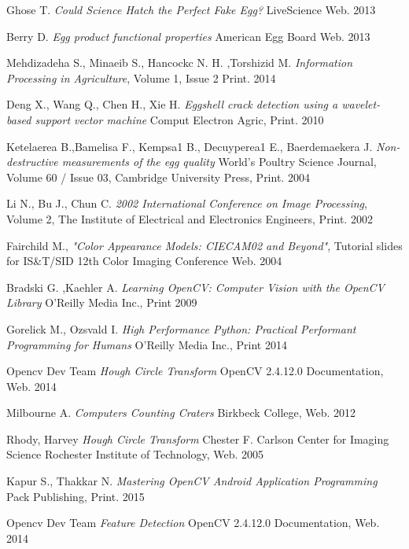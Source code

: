 \documentclass[12pt,twoside,a4paper]{article}
\begin{document}
\begin{thebibliography}{9}


Ghose T.
\textit{Could Science Hatch the Perfect Fake Egg?}  LiveScience Web. 2013
 
Berry D.
\textit{Egg product functional properties} 
American Egg Board Web. 2013

Mehdizadeha S., Minaeib S., Hancockc N. H. ,Torshizid M.
\textit{Information Processing in Agriculture}, Volume 1, Issue 2 
Print. 2014

Deng X., Wang Q., Chen H., Xie H.
\textit{Eggshell crack detection using a wavelet-based support vector machine} Comput Electron Agric, Print. 2010

Ketelaerea B.,Bamelisa F., Kempsa1 B., Decuyperea1 E., Baerdemaekera J.
\textit{Non-destructive measurements of the egg quality} World's Poultry Science Journal, Volume 60 / Issue 03,  Cambridge University Press, Print. 2004
 

Li N., Bu J., Chun C. 
\textit{2002 International Conference on Image Processing}, Volume 2, The Institute of Electrical and Electronics Engineers, Print. 2002

Fairchild M., 
\textit{"Color Appearance Models: CIECAM02 and Beyond"}, Tutorial slides for IS\&T/SID 12th Color Imaging Conference Web. 2004
 
Bradski G. ,Kaehler A.
\textit{Learning OpenCV: Computer Vision with the OpenCV Library} O'Reilly Media Inc., Print 2009


Gorelick M., Ozsvald I.
\textit{High Performance Python: Practical Performant Programming for Humans} O'Reilly Media Inc., Print 2014

Opencv Dev Team
\textit{Hough Circle Transform} OpenCV 2.4.12.0 Documentation, Web. 2014

Milbourne A.
\textit{Computers Counting Craters} Birkbeck College, Web. 2012

Rhody, Harvey
\textit{Hough Circle Transform} Chester F. Carlson Center for Imaging Science Rochester Institute of Technology, Web. 2005

Kapur S., Thakkar N.
\textit{Mastering OpenCV Android Application Programming} Pack Publishing, Print. 2015

Opencv Dev Team
\textit{Feature Detection} OpenCV 2.4.12.0 Documentation, Web. 2014


\end{thebibliography}
\end{document}

